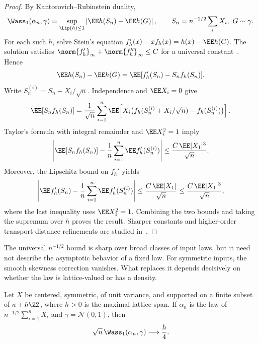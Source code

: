 \begin{proof}
	By Kantorovich--Rubinstein duality,
	\[
		\Wass_1(\alpha_n,\gamma)
		=
		\sup_{\Lip(h)\leq1}
		\left|\EE h(S_n)-\EE h(G)\right|,
		\qquad
		S_n=n^{-1/2}\sum_i X_i,\ G\sim\gamma.
	\]
	For each such $h$, solve Stein's equation
	\(f_h'(x)-x f_h(x)=h(x)-\EE h(G)\).
	The solution satisfies \(\norm{f_h'}_\infty+\norm{f_h''}_\infty\leq C\) for a universal constant~\cite[Chapter~2]{chen2011normal}. Hence
	\[
		\EE h(S_n)-\EE h(G)=\EE[f_h'(S_n)-S_nf_h(S_n)].
	\]
	Write \(S_n^{(i)}=S_n-X_i/\sqrt n\). Independence and \(\EE X_i=0\) give
	\[
		\EE[S_nf_h(S_n)]
		=
		\frac1{\sqrt n}\sum_{i=1}^n
		\EE\!\left[X_i\big(f_h(S_n^{(i)}+X_i/\sqrt n)-f_h(S_n^{(i)})\big)\right].
	\]
	Taylor's formula with integral remainder and \(\EE X_i^2=1\) imply
	\[
		\left|
		\EE[S_nf_h(S_n)]-
		\frac1n\sum_{i=1}^n\EE f_h'(S_n^{(i)})
		\right|
		\leq
		\frac{C\,\EE|X_1|^3}{\sqrt n}.
	\]
	Moreover, the Lipschitz bound on \(f_h'\) yields
	\[
		\left|
		\EE f_h'(S_n)-\frac1n\sum_{i=1}^n\EE f_h'(S_n^{(i)})
		\right|
		\leq
		\frac{C\,\EE|X_1|}{\sqrt n}
		\leq
		\frac{C\,\EE|X_1|^3}{\sqrt n},
	\]
	where the last inequality uses \(\EE X_1^2=1\). Combining the two bounds and taking the supremum over \(h\) proves the result. Sharper constants and higher-order transport-distance refinements are studied in~\cite{bobkov2018berry,rio2011asymptotic}.
\end{proof}

The universal \(n^{-1/2}\) bound is sharp over broad classes of input laws, but it need not describe the asymptotic behavior of a fixed law. For symmetric inputs, the smooth skewness correction vanishes. What replaces it depends decisively on whether the law is lattice-valued or has a density.

\begin{prop}\label{prop-sharp-lattice-w1-clt}
	Let \(X\) be centered, symmetric, of unit variance, and supported on a finite subset of \(a+h\ZZ\), where \(h>0\) is the maximal lattice span. If \(\alpha_n\) is the law of \(n^{-1/2}\sum_{i=1}^nX_i\) and \(\gamma=\mathcal N(0,1)\), then
	\[
		\sqrt n\,\Wass_1(\alpha_n,\gamma)\longrightarrow \frac h4.
	\]
\end{prop}

